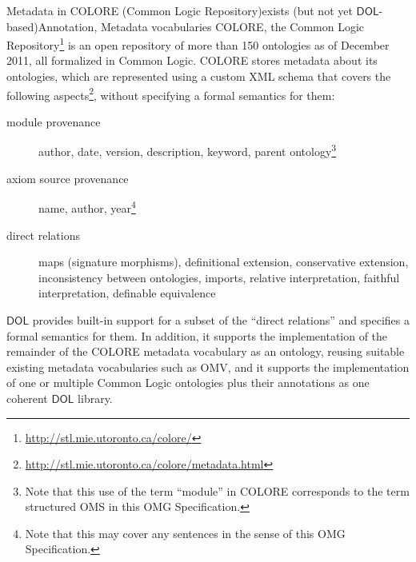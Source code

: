 \documentclass[10pt,fleqn,final]{scrreprt}
\newcommand*{\termref}[1]{\index{#1}#1\xspace}
\newcommand*{\IS}{OMG Specification\xspace}
\newcommand*{\DOL}{\ensuremath{\mathsf{DOL}}\xspace}
\begin{document}
\begin{usecase}{Metadata in COLORE (Common Logic Repository)}{exists (but not yet \DOL-based)}{Annotation, Metadata vocabularies}
  COLORE, the Common Logic Repository\footnote{\url{http://stl.mie.utoronto.ca/colore/}} is an open repository of more than 150 ontologies as of December 2011, all formalized in Common Logic.  COLORE stores metadata about its ontologies, which are represented using a custom XML schema that covers the following aspects\footnote{\url{http://stl.mie.utoronto.ca/colore/metadata.html}}, without specifying a formal semantics for them:
  \begin{description}
  \item[module provenance] author, date, version, description, keyword, parent ontology\footnote{Note that this use of the term ``module'' in COLORE corresponds
to the term \termref{structured OMS} in this \IS{}.}
  \item[axiom source provenance] name, author, year\footnote{Note that this may cover any sentences in the sense of this \IS{}.}
  \item[direct relations] maps (signature morphisms), definitional extension, conservative extension, inconsistency between ontologies, imports, relative interpretation, faithful interpretation, definable equivalence
  \end{description}

  \DOL provides built-in support for a subset of the ``direct relations'' and specifies a formal semantics for them.  In addition, it supports the implementation of  the remainder of the COLORE metadata vocabulary as an ontology, reusing suitable existing metadata vocabularies such as OMV, and it supports the implementation of one or multiple Common Logic ontologies plus their annotations as one coherent \DOL library.
\end{usecase}

\end{document}
